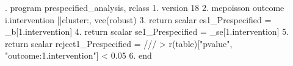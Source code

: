 . program prespecified_analysis, rclass
  1.   version 18
  2.   mepoisson outcome i.intervention ||cluster:, vce(robust)
  3.   return scalar es1_Prespecified      = _b[1.intervention]
  4.   return scalar se1_Prespecified      = _se[1.intervention]
  5.   return scalar reject1_Prespecified  =                                ///
>                     r(table)["pvalue", "outcome:1.intervention"] < 0.05
  6. end
{\smallskip}
